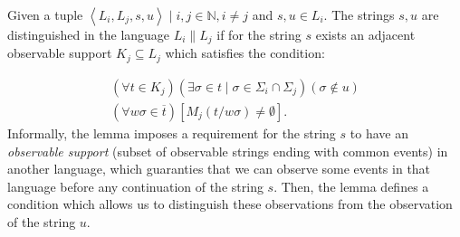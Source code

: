 \begin{lemma}
\label{lem:distinguished}
Given a tuple $\left< L_i, L_j, s, u\right> \mid i, j \in \mathbb{N}, i\neq j$
and $s, u \in L_i$. The strings $s, u$ are
distinguished in the language $L_i \parallel L_j$ if for the string $s$ exists
an adjacent observable support $K_j \subseteq L_j$ which satisfies the
condition:
\end{lemma} 
\begin{equation}
\label{con:distinquished}
	\begin{array}{l}
	 	(\forall t \in K_j)
	 	(\exists \sigma \in t \mid \sigma \in \Sigma_i \cap \Sigma_j)
	 	(\sigma \not \in u)
	 	\\
	 	(\forall w\sigma \in \overline{t})
	 	[M_j(t / w\sigma) \neq \emptyset].
	\end{array}
\end{equation}
Informally, the lemma imposes a requirement for the string $s$ to have an
\emph{observable support} (subset of observable strings ending with common
events) in another language, which guaranties that we can observe some events in that
language before any continuation of the string $s$.
Then, the lemma defines a condition which allows us to distinguish these
observations from the observation of the string $u$.

